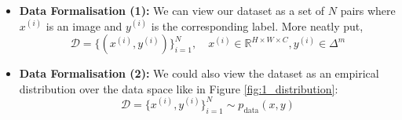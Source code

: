 \begin{enumerate}
\begin{itemize}
              \item \textbf{Data Formalisation (1): }We can view our dataset as a set of $N$ pairs where $x^{(i)}$ is an image and $y^{(i)}$ is the corresponding label. More neatly put,
                    \begin{equation}
                        \mathcal{D} = \{(x^{(i)}, y^{(i)})\}_{i=1}^{N}, \quad x^{(i)} \in \mathbb{R}^{H \times W \times C}, y^{(i)} \in \Delta^m
                    \end{equation}
              \item \textbf{Data Formalisation (2): } We could also view the dataset as an empirical distribution over the data space like in Figure \ref{fig:1_distribution}:
                    \begin{equation}
                        \mathcal{D} = \{x^{(i)}, y^{(i)}\}_{i=1}^{N} \sim p_{\text{data}}(x, y)
                    \end{equation}
                    \begin{marginfigure}
                        \centering
\end{marginfigure}
\end{itemize}
\end{enumerate}
